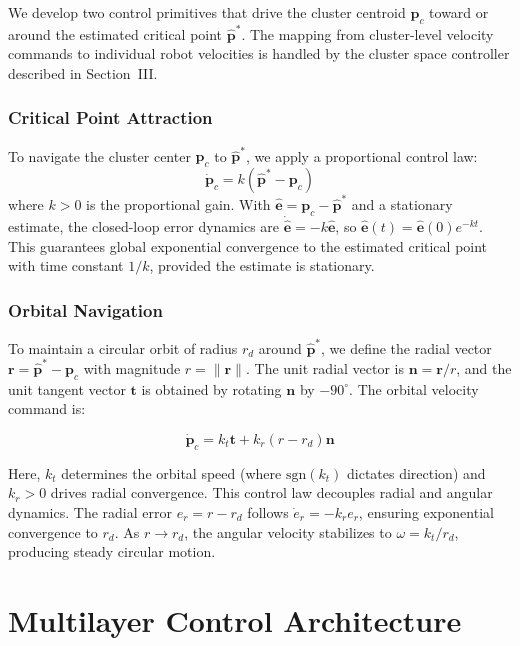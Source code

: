 \documentclass[lettersize,journal]{IEEEtran}
\begin{document}
We develop two control primitives that drive the cluster centroid $\mathbf{p}_c$ toward or around the estimated critical point $\hat{\mathbf{p}}^*$. The mapping from cluster-level velocity commands to individual robot velocities is handled by the cluster space controller described in Section~III.

\subsubsection{Critical Point Attraction}
To navigate the cluster center $\mathbf{p}_c$ to $\hat{\mathbf{p}}^*$, we apply a proportional control law:
\begin{equation}\label{eq:10}
\dot{\mathbf{p}}_c = k(\hat{\mathbf{p}}^* - \mathbf{p}_c)
\end{equation}
where $k > 0$ is the proportional gain. With $\hat{\mathbf{e}} = \mathbf{p}_c - \hat{\mathbf{p}}^*$ and a stationary estimate, the closed-loop error dynamics are $\dot{\hat{\mathbf{e}}} = -k\hat{\mathbf{e}}$, so $\hat{\mathbf{e}}(t) = \hat{\mathbf{e}}(0)e^{-kt}$. This guarantees global exponential convergence to the estimated critical point with time constant $1/k$, provided the estimate is stationary.

\subsubsection{Orbital Navigation}
To maintain a circular orbit of radius $r_d$ around $\hat{\mathbf{p}}^*$, we define the radial vector $\mathbf{r} = \hat{\mathbf{p}}^* - \mathbf{p}_c$ with magnitude $r = \|\mathbf{r}\|$. The unit radial vector is $\mathbf{n} = \mathbf{r}/r$, and the unit tangent vector $\mathbf{t}$ is obtained by rotating $\mathbf{n}$ by $-90^\circ$. The orbital velocity command is:

\begin{equation}\label{eq:11}
\dot{\mathbf{p}}_c = k_t \mathbf{t} + k_r(r - r_d)\mathbf{n}
\end{equation}

Here, $k_t$ determines the orbital speed (where $\text{sgn}(k_t)$ dictates direction) and $k_r > 0$ drives radial convergence.
This control law decouples radial and angular dynamics. The radial error $e_r = r - r_d$ follows $\dot{e}_r = -k_r e_r$, ensuring exponential convergence to $r_d$. As $r \to r_d$, the angular velocity stabilizes to $\omega = k_t/r_d$, producing steady circular motion.

\section{Multilayer Control Architecture}
\end{document}
